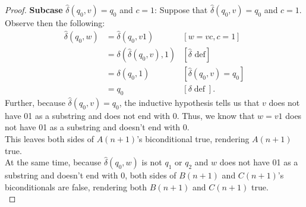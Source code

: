 \documentclass[10pt]{article}
\begin{document}
\begin{enumerate}[label={}]
\begin{proof}
                  \textbf{Subcase }$\hat{\delta}\left(q_0, v\right)=q_0$ and $c=1$: Suppose that $\hat{\delta}\left(q_0, v\right)=q_0$ and $c=1$. Observe then the following:
                  $$
                        \begin{aligned}
                              \hat{\delta}\left(q_0, w\right) & =\hat{\delta}\left(q_0, v 1\right)                     & {[w=v c, c=1] }                                     \\
                                                              & =\delta\left(\hat{\delta}\left(q_0, v\right), 1\right) & {[\hat{\delta} \text { def}] }                      \\
                                                              & =\delta\left(q_0, 1\right)                             & {\left[\hat{\delta}\left(q_0, v\right)=q_0\right] } \\
                                                              & =q_0                                                   & {[\delta \operatorname{def}] . }
                        \end{aligned}
                  $$
                  Further, because $\hat{\delta}\left(q_0, v\right)=q_0$, the inductive hypothesis tells us that $v$ does not have 01 as a substring and does not end with 0. Thus, we know that $w=v1$ does not have 01 as a substring and doesn't end with 0.\\
                  This leaves both sides of $A(n+1)$'s biconditional true, rendering $A(n+1)$ true.\\
                  At the same time, because $\hat{\delta}\left(q_0, w\right)$ is not $q_1$ or $q_2$ and $w$ does not have 01 as a substring and doesn't end with 0, both sides of $B(n+1)$ and $C(n+1)$'s biconditionals are false, rendering both $B(n+1)$ and $C(n+1)$ true.\\


\end{proof}
\end{enumerate}
\end{document}
